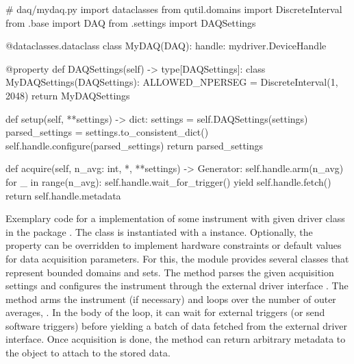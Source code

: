 \begin{listing}
    \begin{py}
        # daq/mydaq.py
        import dataclasses
        from qutil.domains import DiscreteInterval
        from .base import DAQ
        from .settings import DAQSettings

        @dataclasses.dataclass
        class MyDAQ(DAQ):
            handle: mydriver.DeviceHandle

            @property
            def DAQSettings(self) -> type[DAQSettings]:
                class MyDAQSettings(DAQSettings):
                    ALLOWED_NPERSEG = DiscreteInterval(1, 2048)
                return MyDAQSettings

            def setup(self, **settings) -> dict:
                settings = self.DAQSettings(settings)
                parsed_settings = settings.to_consistent_dict()
                self.handle.configure(parsed_settings)
                return parsed_settings

            def acquire(self, n_avg: int, *, **settings) -> Generator:
                self.handle.arm(n_avg)
                for _ in range(n_avg):
                    self.handle.wait_for_trigger()
                    yield self.handle.fetch()
                return self.handle.metadata
    \end{py}
    \caption[ pseudocode]{
        Exemplary code for a  implementation of some instrument with given driver class  in the package .
        The  class is instantiated with a  instance.
        Optionally, the  property can be overridden to implement hardware constraints or default values for data acquisition parameters.
        For this, the  module provides several classes that represent bounded domains and sets.
        The  method parses the given acquisition settings and configures the instrument through the external driver interface .
        The  method arms the instrument (if necessary) and loops over the number of outer averages, .
        In the body of the loop, it can wait for external triggers (or send software triggers) before yielding a batch of data fetched from the external driver interface.
        Once acquisition is done, the method can return arbitrary metadata to the  object to attach to the stored data.
    }
    \label{lst:speck:daq:pseudocode}
\end{listing}

